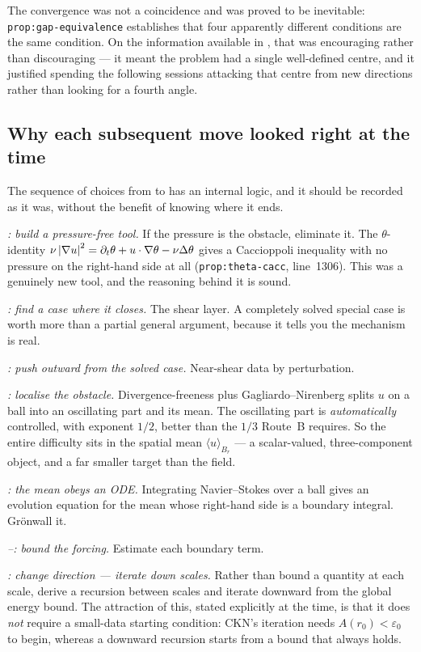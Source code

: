 The convergence was not a coincidence and was proved to be inevitable:
\texttt{prop:gap-equivalence} establishes that four apparently different
conditions are the same condition. On the information available in ,
that was encouraging rather than discouraging --- it meant the problem had a
single well-defined centre, and it justified spending the following sessions
attacking that centre from new directions rather than looking for a fourth
angle.

\subsection{Why each subsequent move looked right at the time}

The sequence of choices from  to  has an internal logic, and it
should be recorded as it was, without the benefit of knowing where it ends.

\emph{: build a pressure-free tool.} If the pressure is the obstacle,
eliminate it. The \(\theta\)-identity \(\nu\left|\nabla u\right|^2=\partial_t\theta+
u\cdot\nabla\theta-\nu\Delta\theta\) gives a Caccioppoli inequality with no
pressure on the right-hand side at all (\texttt{prop:theta-cacc}, line~1306).
This was a genuinely new tool, and the reasoning behind it is sound.

\emph{: find a case where it closes.} The shear layer. A completely
solved special case is worth more than a partial general argument, because it
tells you the mechanism is real.

\emph{: push outward from the solved case.} Near-shear data by
perturbation.

\emph{: localise the obstacle.} Divergence-freeness plus
Gagliardo--Nirenberg splits \(u\) on a ball into an oscillating part and its
mean. The oscillating part is \emph{automatically} controlled, with exponent
\(1/2\), better than the \(1/3\) Route~B requires. So the entire difficulty
sits in the spatial mean \(\langle u\rangle_{B_r}\) --- a scalar-valued,
three-component object, and a far smaller target than the field.

\emph{: the mean obeys an ODE.} Integrating Navier--Stokes over a ball
gives an evolution equation for the mean whose right-hand side is a boundary
integral. Gr\"onwall it.

\emph{--: bound the forcing.} Estimate each boundary term.

\emph{: change direction --- iterate down scales.} Rather than bound a
quantity at each scale, derive a recursion between scales and iterate downward
from the global energy bound. The attraction of this, stated explicitly at the
time, is that it does \emph{not} require a small-data starting condition:
CKN's iteration needs \(A(r_0)<\varepsilon_0\) to begin, whereas a downward
recursion starts from a bound that always holds.

